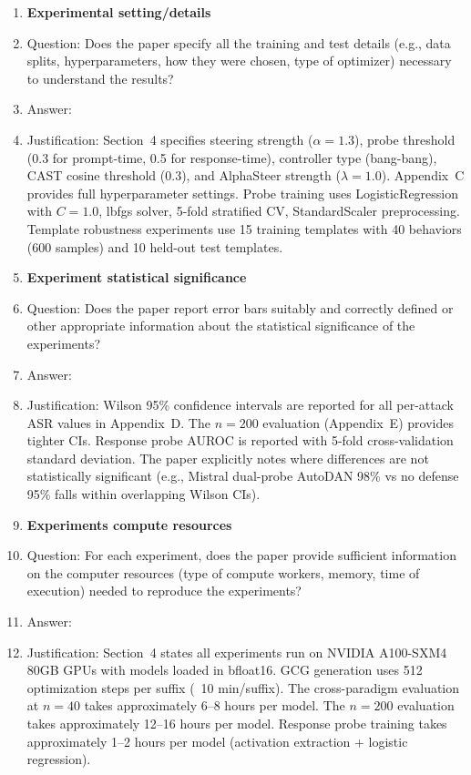 \begin{enumerate}
\item {\bf Experimental setting/details}
    \item[] Question: Does the paper specify all the training and test details (e.g., data splits, hyperparameters, how they were chosen, type of optimizer) necessary to understand the results?
    \item[] Answer: \answerYes{}
    \item[] Justification: Section~4 specifies steering strength ($\alpha=1.3$), probe threshold (0.3 for prompt-time, 0.5 for response-time), controller type (bang-bang), CAST cosine threshold (0.3), and AlphaSteer strength ($\lambda=1.0$). Appendix~C provides full hyperparameter settings. Probe training uses LogisticRegression with $C=1.0$, lbfgs solver, 5-fold stratified CV, StandardScaler preprocessing. Template robustness experiments use 15 training templates with 40 behaviors (600 samples) and 10 held-out test templates.

\item {\bf Experiment statistical significance}
    \item[] Question: Does the paper report error bars suitably and correctly defined or other appropriate information about the statistical significance of the experiments?
    \item[] Answer: \answerYes{}
    \item[] Justification: Wilson 95\% confidence intervals are reported for all per-attack ASR values in Appendix~D. The $n=200$ evaluation (Appendix~E) provides tighter CIs. Response probe AUROC is reported with 5-fold cross-validation standard deviation. The paper explicitly notes where differences are not statistically significant (e.g., Mistral dual-probe AutoDAN 98\% vs no defense 95\% falls within overlapping Wilson CIs).

\item {\bf Experiments compute resources}
    \item[] Question: For each experiment, does the paper provide sufficient information on the computer resources (type of compute workers, memory, time of execution) needed to reproduce the experiments?
    \item[] Answer: \answerYes{}
    \item[] Justification: Section~4 states all experiments run on NVIDIA A100-SXM4 80GB GPUs with models loaded in bfloat16. GCG generation uses 512 optimization steps per suffix (~10 min/suffix). The cross-paradigm evaluation at $n=40$ takes approximately 6--8 hours per model. The $n=200$ evaluation takes approximately 12--16 hours per model. Response probe training takes approximately 1--2 hours per model (activation extraction + logistic regression).


\end{enumerate}
